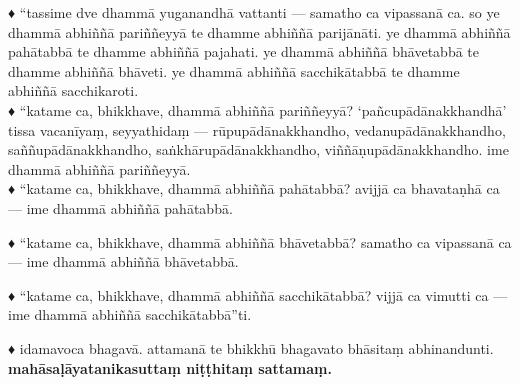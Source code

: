 \documentclass[11pt]{article}
\begin{document}
♦ “tassime dve dhammā yuganandhā vattanti — samatho ca vipassanā ca. so ye dhammā abhiññā pariññeyyā te dhamme abhiññā parijānāti. ye dhammā abhiññā pahātabbā te dhamme abhiññā pajahati. ye dhammā abhiññā bhāvetabbā te dhamme abhiññā bhāveti. ye dhammā abhiññā sacchikātabbā te dhamme abhiññā sacchikaroti.\\

♦ “katame ca, bhikkhave, dhammā abhiññā pariññeyyā? ‘pañcupādānakkhandhā’ tissa vacanīyaṃ, seyyathidaṃ — rūpupādānakkhandho, vedanupādānakkhandho, saññupādānakkhandho, saṅkhārupādānakkhandho, viññāṇupādānakkhandho. ime dhammā abhiññā pariññeyyā.\\

♦ “katame ca, bhikkhave, dhammā abhiññā pahātabbā? avijjā ca bhavataṇhā ca — ime dhammā abhiññā pahātabbā.\

♦ “katame ca, bhikkhave, dhammā abhiññā bhāvetabbā? samatho ca vipassanā ca — ime dhammā abhiññā bhāvetabbā.\

♦ “katame ca, bhikkhave, dhammā abhiññā sacchikātabbā? vijjā ca vimutti ca — ime dhammā abhiññā sacchikātabbā”ti.\

♦ idamavoca bhagavā. attamanā te bhikkhū bhagavato bhāsitaṃ abhinandunti.\\
 [.5cm]

\textbf{mahāsaḷāyatanikasuttaṃ niṭṭhitaṃ sattamaṃ.}
\end{document}
